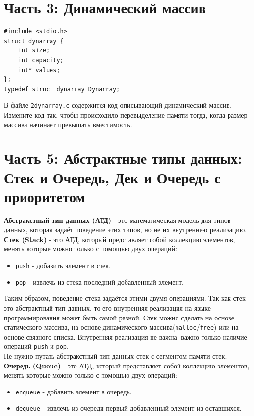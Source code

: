 \documentclass{article}
\begin{document}
\newpage
\section*{Часть 3: Динамический массив}
\begin{lstlisting}
#include <stdio.h>
struct dynarray {
    int size;
    int capacity;
    int* values;
};
typedef struct dynarray Dynarray;
\end{lstlisting}

В файле \texttt{2dynarray.c} содержится код описывающий динамический массив. Измените код так, чтобы происходило перевыделение памяти тогда, когда размер массива начинает превышать вместимость.




\newpage
\section*{Часть 5: Абстрактные типы данных: Стек и Очередь, Дек и Очередь с приоритетом}
\textbf{Абстракстный тип данных (АТД)} - это математическая модель для типов данных, которая задаёт поведение этих типов, но не их внутреннею реализацию.\\

\textbf{Стек (Stack)} - это АТД, который представляет собой коллекцию элементов, менять которые можно только с помощью двух операций:
\begin{itemize}
\item \texttt{push} - добавить элемент в стек.
\item \texttt{pop} - извлечь из стека последний добавленный элемент.
\end{itemize}
Таким образом, поведение стека задаётся этими двумя операциями. Так как стек - это абстрактный тип данных, то его внутренняя реализация на языке программирования может быть самой разной. Стек можно сделать на основе статического массива, на основе динамического массива(\texttt{malloc}/\texttt{free}) или на основе связного списка. Внутренняя реализация не важна, важно только наличие операций \texttt{push} и \texttt{pop}. \\
Не нужно путать абстракстный тип данных стек с сегментом памяти стек.\\

\textbf{Очередь (Queue)} - это АТД, который представляет собой коллекцию элементов, менять которые можно только с помощью двух операций:
\begin{itemize}
\item \texttt{enqueue} - добавить элемент в очередь.
\item \texttt{dequeue} - извлечь из очереди первый добавленный элемент из оставшихся.
\end{itemize}
\end{document}
